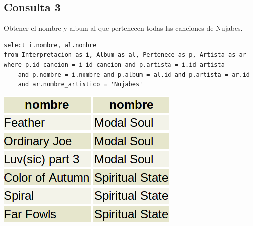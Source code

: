 \documentclass[10pt,a4paper]{article}
\begin{document}
\subsection{Consulta 3}
Obtener el nombre y album al que pertenecen todas las canciones de Nujabes.

\begin{lstlisting}
select i.nombre, al.nombre
from Interpretacion as i, Album as al, Pertenece as p, Artista as ar
where p.id_cancion = i.id_cancion and p.artista = i.id_artista
	and p.nombre = i.nombre and p.album = al.id and p.artista = ar.id
	and ar.nombre_artistico = 'Nujabes'
\end{lstlisting}

\includegraphics[scale=0.35]{resultado_consulta_3.png}

\end{document}
